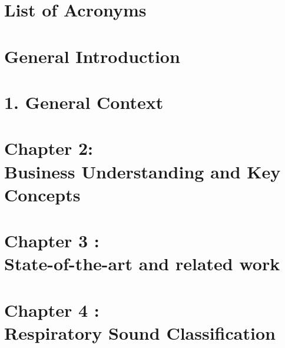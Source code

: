 \documentclass[12pt]{report}
\begin{document}

\newpage
\thispagestyle{empty}
\null
\newpage



\newpage


\chapter*{List of Acronyms}


\listoffigures


\newpage


\chapter*{General Introduction}


\chapter{1. General Context}


\newpage

\setcounter{chapter}{2}  %
\setcounter{section}{0}
\chapter*{Chapter 2:\\ Business Understanding and Key Concepts}





\newpage

\setcounter{chapter}{3}
\setcounter{section}{0}
\chapter*{Chapter 3 :\\ State-of-the-art and related work}



\setcounter{chapter}{4}
\chapter*{Chapter 4 :\\ Respiratory Sound Classification}






\end{document}
